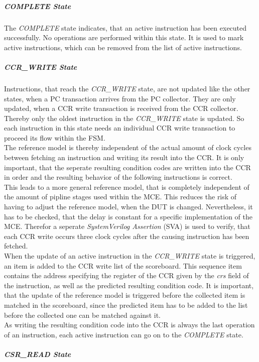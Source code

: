 \subparagraph{COMPLETE State}

The \emph{COMPLETE} state indicates, that an active instruction has been executed successfully.
No operations are performed within this state.
It is used to mark active instructions, which can be removed from the list of active instructions.

\subparagraph{CCR\_WRITE State}

Instructions, that reach the \emph{CCR\_WRITE} state, are not updated like the other states, when a PC transaction arrives from the PC collector.
They are only updated, when a CCR write transaction is received from the CCR collector.
Thereby only the oldest instruction in the \emph{CCR\_WRITE} state is updated.
So each instruction in this state needs an individual CCR write transaction to proceed its flow within the FSM.\\
The reference model is thereby independent of the actual amount of clock cycles between fetching an instruction and writing its result into the CCR.
It is only important, that the seperate resulting condition codes are written into the CCR in order and the resulting behavior of the following instructions is
correct.\\
This leads to a more general reference model, that is completely independent of the amount of pipline stages used within the MCE.
This reduces the risk of having to adjust the reference model, when the DUT is changed.
Nevertheless, it has to be checked, that the delay is constant for a specific implementation of the MCE.
Therefor a seperate \emph{SystemVerilog Assertion} (SVA) is used to verify, that each CCR write occurs three clock cycles after the causing instruction has been
fetched.\\
When the update of an active instruction in the \emph{CCR\_WRITE} state is triggered, an item is added to the CCR write list of the scoreboard.
This sequence item contains the address specifying the register of the CCR given by the \emph{crs} field of the instruction, as well as the predicted resulting
condition code.
It is important, that the update of the reference model is triggered before the collected item is matched in the scoreboard, since the predicted item has to be
added to the list before the collected one can be matched against it.\\
As writing the resulting condition code into the CCR is always the last operation of an instruction, each active instruction can go on to the \emph{COMPLETE}
state.

\subparagraph{CSR\_READ State}

